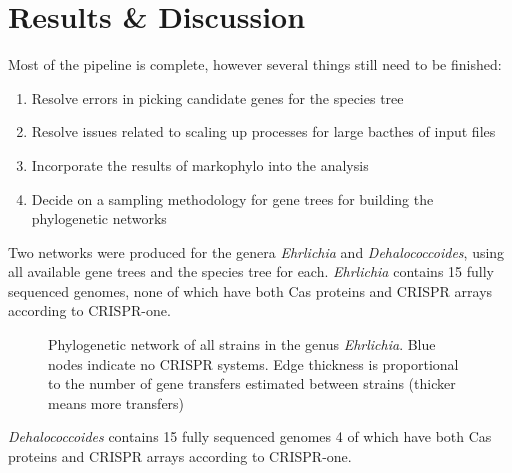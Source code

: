 \documentclass[12pt,letter]{article}
\begin{document}
\section*{\huge Results \& Discussion}
Most of the pipeline is complete, however several things still need to be finished:
\begin{enumerate}
    \item Resolve errors in picking candidate genes for the species tree
    \item Resolve issues related to scaling up processes for large bacthes of input files
    \item Incorporate the results of markophylo into the analysis
    \item Decide on a sampling methodology for gene trees for building the phylogenetic networks
\end{enumerate}
Two networks were produced for the genera \textit{Ehrlichia} and \textit{Dehalococcoides}, using all available gene trees and the species tree for each.
\textit{Ehrlichia} contains 15 fully sequenced genomes, none of which have both Cas proteins and CRISPR arrays according to CRISPR-one.
\begin{figure}[htb!]
    \caption{Phylogenetic network of all strains in the genus \textit{Ehrlichia}. Blue nodes indicate no CRISPR systems. Edge thickness is proportional to the number of gene transfers estimated between strains (thicker means more transfers)}
\end{figure}
\FloatBarrier
\textit{Dehalococcoides} contains 15 fully sequenced genomes 4 of which have both Cas proteins and CRISPR arrays according to CRISPR-one.
\end{document}
